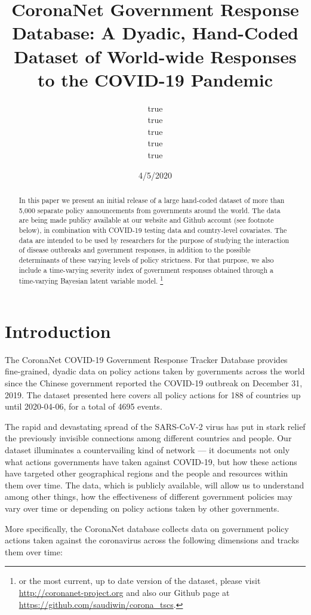 \documentclass[]{article}
\title{CoronaNet Government Response Database: A Dyadic, Hand-Coded Dataset of World-wide Responses to the COVID-19 Pandemic}
\author{true \\ true \\ true \\ true \\ true}
\date{4/5/2020}
\let\rmarkdownfootnote\footnote%
\def\footnote{\protect\rmarkdownfootnote}
\begin{document}
\maketitle
\begin{abstract}
In this paper we present an initial release of a large hand-coded dataset of more than 5,000 separate policy announcements from governments around the world. The data are being made publicy available at our website and Github account (see footnote below), in combination with COVID-19 testing data and country-level covariates. The data are intended to be used by researchers for the purpose of studying the interaction of disease outbreaks and government responses, in addition to the possible determinants of these varying levels of policy strictness. For that purpose, we also include a time-varying severity index of government responses obtained through a time-varying Bayesian latent variable model. \footnote{or the most current, up to date version of the dataset, please visit \url{http://coronanet-project.org} and also our Github page at \url{https://github.com/saudiwin/corona_tscs}.}
\end{abstract}

\hypertarget{introduction}{%
\section{Introduction}\label{introduction}}

The CoronaNet COVID-19 Government Response Tracker Database provides fine-grained, dyadic data on policy actions taken by governments across the world since the Chinese government reported the COVID-19 outbreak on December 31, 2019. The dataset presented here covers all policy actions for 188 of countries up until 2020-04-06, for a total of 4695 events.

The rapid and devastating spread of the SARS-CoV-2 virus has put in stark relief the previously invisible connections among different countries and people. Our dataset illuminates a countervailing kind of network --- it documents not only what actions governments have taken against COVID-19, but how these actions have targeted other geographical regions and the people and resources within them over time. The data, which is publicly available, will allow us to understand among other things, how the effectiveness of different government policies may vary over time or depending on policy actions taken by other governments.

More specifically, the CoronaNet database collects data on government policy actions taken against the coronavirus across the following dimensions and tracks them over time:
\end{document}

